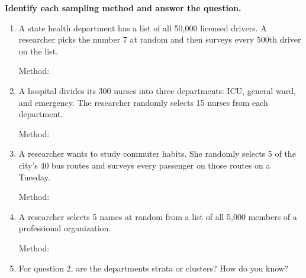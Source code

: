 \documentclass[10pt]{article}
\begin{document}
\namedateperiod

\vspace{0.14in}

\begin{practicebox}
\small
\textbf{Identify each sampling method and answer the question.}

\vspace{8pt}
\begin{enumerate}[leftmargin=1.5em, itemsep=10pt]
  \item A state health department has a list of all 50{,}000 licensed drivers. A
        researcher picks the number 7 at random and then surveys every 500th driver
        on the list.

        Method: \blank{8cm}

  \item A hospital divides its 300 nurses into three departments: ICU, general ward,
        and emergency. The researcher randomly selects 15 nurses from each department.

        Method: \blank{8cm}

  \item A researcher wants to study commuter habits. She randomly selects 5 of the
        city's 40 bus routes and surveys every passenger on those routes on a Tuesday.

        Method: \blank{8cm}

  \item A researcher selects 5 names at random from a list of all 5{,}000 members of
        a professional organization.

        Method: \blank{8cm}

  \item For question 2, are the departments strata or clusters? How do you know?\\
        \writeline\\[1pt]\writeline
\end{enumerate}
\end{practicebox}
\end{document}
